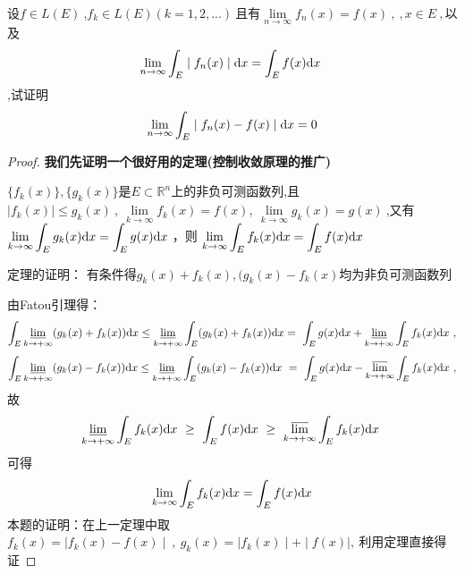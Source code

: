 设$f\in L(E) \ $,$f_k\in L(E)(k=1,2,...)\ $且有$\lim\limits_{n \to \infty}f_n(x)=f(x)\ ,\ ,x\in E\ ,$以及$$\lim\limits_{n \to \infty}\int_E \mid f_n(x)\mid \mathrm{d}x=\int_E f(x)\mathrm{d}x\ $$,试证明$$\lim\limits_{n \to \infty}\int_E \mid f_n(x)-f(x)\mid \mathrm{d}x=0$$
\begin{proof}
	\textbf{我们先证明一个很好用的定理(控制收敛原理的推广)}\par
	$\{f_k(x)\},\{g_k(x)\}$是$E \subset \mathbb{R}^n$上的非负可测函数列,且$\mid f_k(x) \mid \leq g_k(x)\ ,\ \lim\limits_{k \to \infty}f_k(x)=f(x),\ \lim\limits_{k \to \infty}g_k(x)=g(x)\ $,又有$\lim\limits_{k \to \infty}\displaystyle{\int_E g_k(x)\mathrm{d}x}=\displaystyle{\int_E g(x)\mathrm{d}x}\ $，则$\ \lim\limits_{k \to \infty}\displaystyle{\int_E f_k(x)\mathrm{d}x}=\displaystyle{\int_E f(x)\mathrm{d}x}\ $\par
	定理的证明： 	有条件得$g_k(x)+f_k(x),(g_k(x)-f_k(x)$均为非负可测函数列\par
	由Fatou引理得：	
	$$\int_E \varliminf_{k \to +\infty}(g_k(x)+f_k(x))\mathrm{d}x\leq \varliminf_{k \to +\infty}\int_E (g_k(x)+f_k(x))\mathrm{d}x=\ \int_E g(x)\mathrm{d}x+\varliminf_{k \to +\infty}\int_E f_k(x)\mathrm{d}x\ ,$$  
	$$\int_E \varliminf_{k \to +\infty}(g_k(x)-f_k(x))\mathrm{d}x\leq \varliminf_{k \to +\infty}\int_E (g_k(x)-f_k(x))\mathrm{d}x\ =\ \int_E g(x)\mathrm{d}x-\varlimsup_{k \to +\infty}\int_E f_k(x)\mathrm{d}x\ ,$$
	故$$\varliminf_{k \to +\infty}\int_E f_k(x)\di{x}\ \geq\  \int_E f(x)\di{x}\ \geq\ \varlimsup_{k \to +\infty}\int_E f_k(x)\di{x}\ $$
	可得$$\ \lim\limits_{k \to \infty}\int_E f_k(x)\di{x}=\int_E f(x)\di{x}\ $$
	本题的证明：在上一定理中取$f_k(x)=\mid f_k(x)-f(x)\mid\ ,\ g_k(x)=\mid f_k(x)\mid+\mid f(x)\mid,\ $利用定理直接得证	
\end{proof}